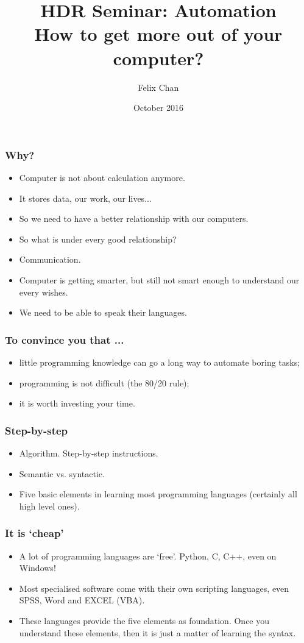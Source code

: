 \documentclass[notheorems, envcountsect,10pt]{beamer}
\title{HDR Seminar: Automation \\ How to get more out of your computer?}
\author{Felix Chan \inst{1}}
\institute{\inst{1} School of Economics and Finance, Curtin University}
\date{October 2016}
\begin{document}
 
\begin{frame}
    \titlepage
\end{frame} 

\begin{frame}
    \frametitle{Why?}
    \begin{itemize}
        \item Computer is not about calculation anymore. 
        \item It stores data, our work, our lives... 
        \item So we need to have a better relationship with our computers. 
        \item So what is under every good relationship? \pause
        \item Communication. 
        \item Computer is getting smarter, but still not smart enough to understand our every wishes. 
        \item We need to be able to speak their languages. 
    \end{itemize} 
\end{frame} 
\begin{frame} 
    \frametitle{To convince you that  ...}
    \begin{itemize} 
        \item little programming knowledge can go a long way to automate boring tasks;
        \item programming is not difficult (the 80/20 rule);
        \item it is worth investing your time. 
    \end{itemize} 
\end{frame} 
\begin{frame} 
    \frametitle{Step-by-step} 
    \begin{itemize}
        \item Algorithm. Step-by-step instructions.
        \item Semantic vs. syntactic. 
        \item Five basic elements in learning most programming languages (certainly all high level ones). 
    \end{itemize}
\end{frame} 
\begin{frame} 
    \frametitle{It is `cheap'}
    \begin{itemize}
        \item A lot of programming languages are `free'. Python, C, C++, even on Windows!
        \item Most specialised software come with their own scripting languages, even SPSS, Word and EXCEL (VBA).
        \item These languages provide the five elements as foundation. Once you understand these elements, then it is just a matter of learning the syntax.  
    \end{itemize} 
\end{frame} 
\end{document}
